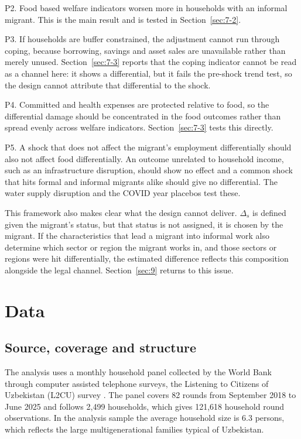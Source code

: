 P2. Food based welfare indicators worsen more in households with an informal migrant. This is the main result and is tested in Section~\ref{sec:7-2}.

P3. If households are buffer constrained, the adjustment cannot run through coping, because borrowing, savings and asset sales are unavailable rather than merely unused. Section~\ref{sec:7-3} reports that the coping indicator cannot be read as a channel here: it shows a differential, but it fails the pre-shock trend test, so the design cannot attribute that differential to the shock.

P4. Committed and health expenses are protected relative to food, so the differential damage should be concentrated in the food outcomes rather than spread evenly across welfare indicators. Section~\ref{sec:7-3} tests this directly.

P5. A shock that does not affect the migrant's employment differentially should also not affect food differentially. An outcome unrelated to household income, such as an infrastructure disruption, should show no effect and a common shock that hits formal and informal migrants alike should give no differential. The water supply disruption and the COVID year placebos test these.

This framework also makes clear what the design cannot deliver. $\Delta_{s}$ is defined given the migrant's status, but that status is not assigned, it is chosen by the migrant. If the characteristics that lead a migrant into informal work also determine which sector or region the migrant works in, and those sectors or regions were hit differentially, the estimated difference reflects this composition alongside the legal channel. Section~\ref{sec:9} returns to this issue.

\section{Data}\label{sec:5}

\subsection{Source, coverage and structure}\label{sec:5-1}

The analysis uses a monthly household panel collected by the World Bank through computer assisted telephone surveys, the Listening to Citizens of Uzbekistan (L2CU) survey \parencite{l2cu}. The panel covers 82 rounds from September 2018 to June 2025 and follows 2,499 households, which gives 121,618 household round observations. In the analysis sample the average household size is 6.3 persons, which reflects the large multigenerational families typical of Uzbekistan.

